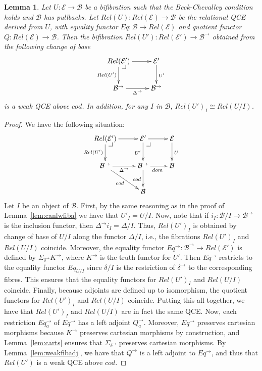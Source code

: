 \documentclass{LMCS}
\makeatletter
\newcommand\lpbc[1][dr]{\save*!/#1-1.2pc/#1:(-1,1)@^{|-}\restore}
\newcommand\E{{\mathcal E}}
\newcommand\B{{\mathcal B}}
\theoremstyle{plain}
\newtheorem{lemma}[theorem]{Lemma}
\theoremstyle{remark}
\theoremstyle{definition}
\makeatother
\begin{document}
\begin{lemma}\label{lem:wqcer}
  Let $U : \E \to \B$ be a bifibration such that the Beck-Chevalley
  condition holds and $\B$ has pullbacks.  Let $Rel(U):Rel(\E)\to\B$
  be the relational QCE derived from $U$, with equality functor
  $Eq:\B\to Rel(\E)$ and quotient functor $Q:Rel(\E)\to\B$.  Then the
  bifibration $Rel(U'):Rel(\E')\to\B^\to$ obtained from the following
  change of base
  \[\xymatrix{
    \ar[d]_{Rel(U')} Rel(\E') \ar[r] \lpbc & \E' \ar[d]^{U'}\\
    \B^\to \ar[r]_{\Delta^\to} & \B^\to }\]
  is a weak QCE above $cod$. In addition, for any $I$ in $\B$,
  $Rel(U')_I \cong Rel(U/I)$.
\end{lemma}
\begin{proof}
  We have the following situation:
  \[\xymatrix{
    Rel(\E') \ar[d]_{Rel(U')} \ar[r] \lpbc &\ar[d]_{U'} \E' \ar[r] \lpbc
    & \E \ar[d]^U\\  
    \B^\to \ar[rd]_{cod} \ar[r]_{\Delta^\to} & \ar[d]_{cod} \B^\to
    \ar[r]_{dom} & \B\\ 
    &\B
  }\]
  Let $I$ be an object of $\B$. First, by the same reasoning as in the
  proof of Lemma~\ref{lem:canlwfiba} we have that $U'_I = U/I$. Now,
  note that if $i_I:\B/I\to\B^\to$ is the inclusion functor, then
  $\Delta^\to i_I = \Delta/I$. Thus, $Rel(U')_I$ is obtained by change
  of base of $U/I$ along the functor $\Delta/I$, i.e., the fibrations
  $Rel(U')_I$ and $Rel(U/I)$ coincide.  Moreover, the equality functor
  $Eq^\to:\B^\to\to Rel(\E')$ is defined by
  $\Sigma_{\delta^\to}K^\to$, where $K^\to$ is the truth functor for
  $U'$. Then $Eq^\to$ restricts to the equality functor $Eq_{U/I}$
  since $\delta/I$ is the restriction of $\delta^\to$ to the
  corresponding fibres. This ensures that the equality functors for
  $Rel(U')_I$ and $Rel(U/I)$ coincide.  Finally, because adjoints are
  defined up to isomorphism, the quotient functors for $Rel(U')_I$ and
  $Rel(U/I)$ coincide. Putting this all together, we have that
  $Rel(U')_I$ and $Rel(U/I)$ are in fact the same QCE.  Now, each
  restriction $Eq^\to_a$ of $Eq^\to$ has a left adjoint $Q^\to_a$.
  Moreover, $Eq^\to$ preserves cartesian morphisms because $K^\to$
  preserves cartesian morphisms by construction, and
  Lemma~\ref{lem:carts} ensures that $\Sigma_{\delta^\to}$ preserves
  cartesian morphisms. By Lemma~\ref{lem:weakfibadj}, we have that
  $Q^\to$ is a left adjoint to $Eq^\to$, and thus that $Rel(U')$ is a
  weak QCE above $\mathit{cod}$.
\end{proof}
\end{document}
